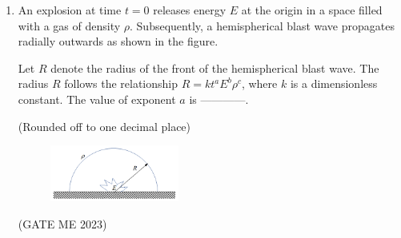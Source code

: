 \documentclass[journal]{IEEEtran}
\begin{document}
\begin{enumerate}
\item An explosion at time $ t = 0 $ releases energy $ E $ at the origin in a space filled with a gas of density $ \rho $. Subsequently, a hemispherical blast wave propagates radially outwards as shown in the figure. 

Let $ R $ denote the radius of the front of the hemispherical blast wave. The radius $ R $ follows the relationship $ R = k  t^a E^b \rho^c $, where $ k $ is a dimensionless constant. The value of exponent $ a $ is ------------. 

(Rounded off to one decimal place)

\begin{figure}[H]
\centering
\includegraphics[width=0.4\textwidth]{Fig 54.png}
\caption{}
\label{fig:question65}
\end{figure}
\hfill (GATE ME 2023)

\end{enumerate}
\end{document}
